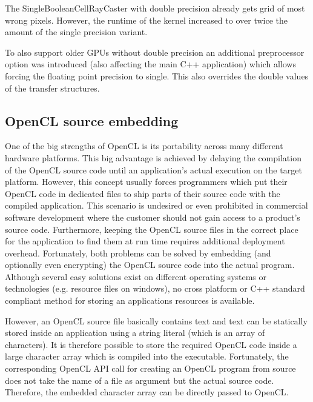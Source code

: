 The SingleBooleanCellRayCaster with double precision already gets grid of most wrong pixels. However, the runtime of the kernel increased to over twice the amount of the single precision variant.

To also support older GPUs without double precision an additional preprocessor option was introduced (also affecting the main C++ application) which allows forcing the floating point precision to single. This also overrides the double values of the transfer structures.

\subsection{OpenCL source embedding}

One of the big strengths of OpenCL is its portability across many different hardware platforms. This big advantage is achieved by delaying the compilation of the OpenCL source code until an application's actual execution on the target platform. However, this concept usually forces programmers which put their OpenCL code in dedicated files to ship parts of their source code with the compiled application. This scenario is undesired or even prohibited in commercial software development where the customer should not gain access to a product's source code. Furthermore, keeping the OpenCL source files in the correct place for the application to find them at run time requires additional deployment overhead. Fortunately, both problems can be solved by embedding (and optionally even encrypting) the OpenCL source code into the actual program. Although several easy solutions exist on different operating systems or technologies (e.g. resource files on windows), no cross platform or C++ standard compliant method for storing an applications resources is available.

However, an OpenCL source file basically contains text and text can be statically stored inside an application using a string literal (which is an array of characters). It is therefore possible to store the required OpenCL code inside a large character array which is compiled into the executable. Fortunately, the corresponding OpenCL API call for creating an OpenCL program from source does not take the name of a file as argument but the actual source code. Therefore, the embedded character array can be directly passed to OpenCL.


